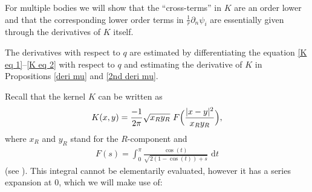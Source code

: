 \documentclass[JEP,XML,SOM,Unicode,published]{cedram}
\theoremstyle{definition}
\newcommand\eq{=}
\newcommand\dd{\,\mathrm{d}}
\newcommand\dt{\dd t}
\let\de\partial
\begin{document}
For multiple bodies we will show that the ``cross-terms'' in $K$ are an order lower and that the corresponding lower order terms in $\frac{1}{r}\de_n\psi_i$ are essentially given through the derivatives of $K$ itself.

The derivatives with respect to $q$ are estimated by differentiating the equation \eqref{K eq 1}--\eqref{K eq 2} with respect to $q$ and estimating the derivative of $K$ in Propositions \ref{deri mu} and \ref{2nd deri mu}.

Recall that the kernel $K$ can be written as
\begin{align}\label{exp K}
K(x,y)\eq\frac{-1}{2\pi}\sqrt{x_Ry_R}\,\,F\Bigl(\frac{|x-y|^2}{x_Ry_R}\Bigr),
\end{align}
where $x_R$ and $y_R$ stand for the $R$-component and
\begin{align*}
F(s)\eq\int_0^\pi \frac{\cos(t)}{\sqrt{2(1-\cos(t))+s}}\,\dt
\end{align*}
(see \cite[\S 2]{GallaySverak}). This integral cannot be elementarily evaluated, however it has a series expansion at $0$, which we will make use of:
\end{document}
